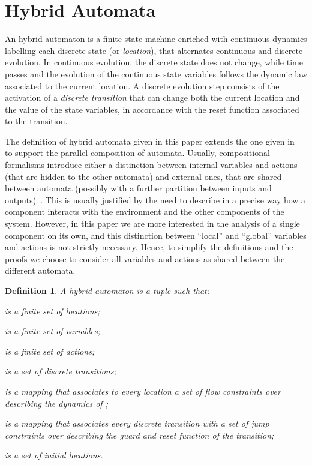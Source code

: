 \documentclass[submission,copyright,creativecommons]{eptcs}
\newtheorem{definition}{Definition}
\begin{document}
\section{Hybrid Automata}\label{sec:ha}

An hybrid automaton is a finite state machine enriched with continuous dynamics labelling each discrete state (or \emph{location}), that alternates continuous and discrete evolution. In continuous evolution, the discrete state does not change, while time passes and the evolution of the continuous state variables follows the dynamic law associated to the current location. A discrete evolution step consists of the activation of a \emph{discrete transition} that can change both the current location and the value of the state variables, in accordance with the reset function associated to the transition. 


The definition of hybrid automata given in this paper extends the one given in~\cite{Alur} to support the parallel composition of automata. Usually, compositional formalisms introduce either a distinction between internal variables and actions (that are hidden to the other automata) and external ones, that are shared between automata (possibly with a further partition between inputs and outputs)~\cite{Lynch03}. This is usually justified by the need to describe in a precise way how a component interacts with the environment and the other components of the system. However, in this paper we are more interested in the analysis of a single component on its own, and this distinction between ``local'' and ``global'' variables and actions is not strictly necessary. Hence, to simplify the definitions and the proofs we choose to consider all variables and actions as shared between the different automata. 

\begin{definition}\label{def:ha-syntax}
   A \emph{hybrid automaton} is a tuple  such that:
   
   \begin{compactenum}
   	\item  is a finite set of \emph{locations};
   	\item  is a finite set of \emph{variables};
		\item  is a finite set of \emph{actions};
		\item  is a set of \emph{discrete transitions};
		\item  is a mapping that associates to every location  a set of flow constraints  over  describing the \emph{dynamics} of ;
		\item  is a mapping that associates every discrete transition  with a set of jump constraints  over  describing the guard and reset function of the transition;
		\item  is a set of \emph{initial locations}.
\end{compactenum}
\end{definition}
\end{document}
